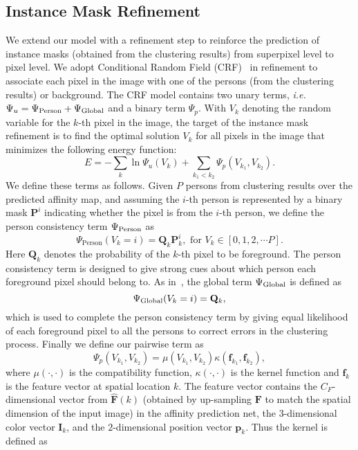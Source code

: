 \documentclass[10pt, letterpaper]{article}
\begin{document}
\subsection{Instance Mask Refinement }
We extend our model with a refinement step to reinforce the prediction of instance masks (obtained from the clustering results) from superpixel level to pixel level. We adopt Conditional Random Field (CRF)~\cite{lafferty2001conditional} in refinement to associate each pixel in the image with one of the persons (from the clustering results) or background. The CRF model contains two  unary terms, \emph{i.e.} $ \Psi_{u} = \Psi_{\rm{Person}} +\Psi_{\rm{Global}}$ and a binary term $\Psi_{p}$. With $V_k$ denoting  the random variable for the $k$-th pixel in the image, the target of the instance mask refinement is to find the optimal solution $V_k$ for all pixels in the image that minimizes the following energy function:
\begin{equation}\label{eqn:crf_energy}
\mathit{E} = -\sum_k \ln \Psi_{u}(V_k) + \sum_{k_1<k_2} \Psi_{p}(V_{k_1}, V_{k_2}). 
\end{equation}
We define these terms as follows. Given $P$ persons from clustering results over the predicted affinity map, and assuming the $i$-th person is represented by a binary mask $\mathbf{P}^i$ indicating whether the pixel is from the $i$-th person, we define the person consistency term $\Psi_{\rm{Person}}$ as
\begin{equation}\label{eqn:person_consistency}
\Psi_{\mathrm{Person}} (V_k = i) = \mathbf{Q}_k \mathbf{P}^i_k, 
\text{ for } V_k \in [0, 1, 2, \cdots P].
\end{equation}
Here $\mathbf{Q}_k$ denotes the probability of the $k$-th pixel to be foreground. The person consistency term is designed to give strong cues about which person each foreground pixel should belong to. As in~\cite{arnab2017pixelwise,li2017holistic}, the global term $\Psi_{\rm{Global}}$ is defined as 
\begin{equation}
\Psi_{\rm{Global}} (V_k = i) = \mathbf{Q}_k,
\end{equation}
which is used to complete the person consistency term by giving equal likelihood of each foreground pixel to all the persons to correct errors in the clustering process. Finally we define our pairwise term as
\begin{equation}
\Psi_{p}(V_{k_1}, V_{k_2})= \mu(V_{k_1}, V_{k_2}) \kappa(\mathbf{f}_{k_1}, \mathbf{f}_{k_2}),
\end{equation}
where $\mu(\cdot, \cdot)$ is the compatibility function, $\kappa(\cdot, \cdot)$ is the kernel function and $\mathbf{f}_k$ is the feature vector at spatial location $k$. The feature vector contains the $C_F$-dimensional vector from $\hat{\mathbf{F}}(k)$ (obtained by up-sampling $\mathbf{F}$ to match the spatial dimension of the input image) in the affinity prediction net, the $3$-dimensional color vector $\mathbf{I}_{k}$, and the $2$-dimensional position vector $\mathbf{p}_{k}$. Thus the kernel is defined as 
\end{document}
